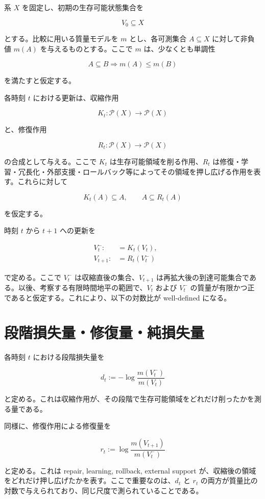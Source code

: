 \documentclass[12pt,a4paper]{article}
\begin{document}
系 \(X\) を固定し、初期の生存可能状態集合を

\[
V_0 \subseteq X
\]

とする。比較に用いる質量モデルを \(m\) とし、各可測集合 \(A \subseteq X\) に対して非負値 \(m(A)\) を与えるものとする。ここで \(m\) は、少なくとも単調性

\[
A \subseteq B \Longrightarrow m(A) \le m(B)
\]

を満たすと仮定する。

各時刻 \(t\) における更新は、収縮作用

\[
K_{t} : \mathcal P(X) \to \mathcal P(X)
\]

と、修復作用

\[
R_{t} : \mathcal P(X) \to \mathcal P(X)
\]

の合成として与える。ここで \(K_{t}\) は生存可能領域を削る作用、\(R_{t}\) は修復・学習・冗長化・外部支援・ロールバック等によってその領域を押し広げる作用を表す。これらに対して

\[
K_{t}(A) \subseteq A, \qquad A \subseteq R_{t}(A)
\]

を仮定する。

時刻 \(t\) から \(t+1\) への更新を

\[
\begin{aligned}
V_{t}^- :&= K_{t}(V_{t}), \qquad \\
V_{t+1} :&= R_{t}(V_{t}^-)
\end{aligned}
\]

で定める。ここで \(V_{t}^-\) は収縮直後の集合、\(V_{t+1}\) は再拡大後の到達可能集合である。以後、考察する有限時間地平の範囲で、\(V_{t}\) および \(V_{t}^-\) の質量が有限かつ正であると仮定する。これにより、以下の対数比が well-defined になる。

\section{段階損失量・修復量・純損失量}\label{ux6bb5ux968eux640dux5931ux91cfux4feeux5fa9ux91cfux7d14ux640dux5931ux91cf}

各時刻 \(t\) における段階損失量を

\[
d_{t} := - \log \frac{m(V_{t}^-)}{m(V_{t})}
\]

と定める。これは収縮作用が、その段階で生存可能領域をどれだけ削ったかを測る量である。

同様に、修復作用による修復量を

\[
r_{t} := \log \frac{m(V_{t+1})}{m(V_{t}^-)}
\]

と定める。これは repair, learning, rollback, external support が、収縮後の領域をどれだけ押し広げたかを表す。ここで重要なのは、\(d_{t}\) と \(r_{t}\) の両方が質量比の対数で与えられており、同じ尺度で測られていることである。
\end{document}
